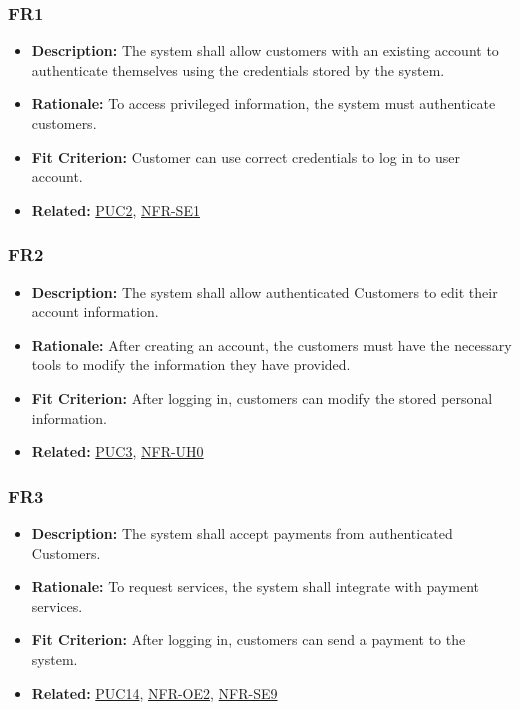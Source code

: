 \documentclass[12pt]{article}
\begin{document}
\subsubsection*{FR1}
\label{sec:FR1}
\begin{itemize}
  \item \textbf{Description:} The system shall allow customers with an existing account to authenticate themselves using the credentials stored by the system.
  \item \textbf{Rationale:} To access privileged information, the system must authenticate customers.
  \item \textbf{Fit Criterion:} Customer can use correct credentials to log in to user account.
  \item \textbf{Related:} \hyperref[sec:PUC2]{PUC2}, \hyperref[sec:SE1]{NFR-SE1}
\end{itemize}
\subsubsection*{FR2}
\label{sec:FR2}
\begin{itemize}
  \item \textbf{Description:} The system shall allow authenticated Customers to edit their account information.
  \item \textbf{Rationale:} After creating an account, the customers must have the necessary tools to modify the information they have provided.
  \item \textbf{Fit Criterion:} After logging in, customers can modify the stored personal information.
  \item \textbf{Related:} \hyperref[sec:PUC3]{PUC3}, \hyperref[sec:UH0]{NFR-UH0}
\end{itemize}
\subsubsection*{FR3}
\label{sec:FR3}
\begin{itemize}
  \item \textbf{Description:} The system shall accept payments from authenticated Customers.
  \item \textbf{Rationale:} To request services, the system shall integrate with payment services.
  \item \textbf{Fit Criterion:} After logging in, customers can send a payment to the system.
  \item \textbf{Related:} \hyperref[sec:PUC14]{PUC14}, \hyperref[sec:OE2]{NFR-OE2}, \hyperref[sec:SE9]{NFR-SE9}
\end{itemize}
\end{document}
